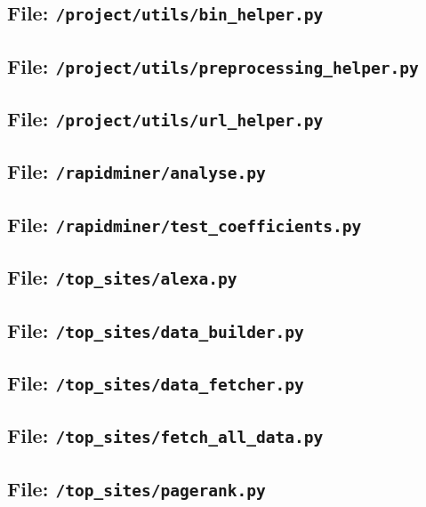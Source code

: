 \subsection{File: \texttt{/project/utils/bin\_helper.py}}
\subsection{File: \texttt{/project/utils/preprocessing\_helper.py}}
\subsection{File: \texttt{/project/utils/url\_helper.py}}
\subsection{File: \texttt{/rapidminer/analyse.py}}
\subsection{File: \texttt{/rapidminer/test\_coefficients.py}}
\subsection{File: \texttt{/top\_sites/alexa.py}}
\subsection{File: \texttt{/top\_sites/data\_builder.py}}
\subsection{File: \texttt{/top\_sites/data\_fetcher.py}}
\subsection{File: \texttt{/top\_sites/fetch\_all\_data.py}}
\subsection{File: \texttt{/top\_sites/pagerank.py}}
